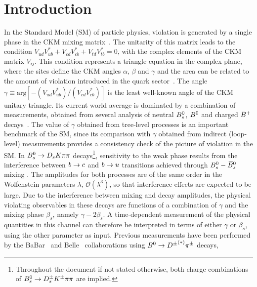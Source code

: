 \section{Introduction}
\label{sec:Introduction}

In the Standard Model (SM) of particle physics, \CP violation is generated by a single phase in the CKM mixing matrix~\cite{Cabibbo:1963yz,doi:10.1143/PTP.49.652}.
The unitarity of this matrix leads to the condition $V_{ud}V^{*}_{ub} + V_{cd}V^{*}_{cb} + V_{td}V^{*}_{tb} = 0$, with the complex elements of the CKM matrix $V_{ij}$. 
This condition represents a triangle equation in the complex plane, where the sites define the CKM angles $\alpha$, $\beta$ and $\gamma$ 
and the area can be related to the amount of \CP violation introduced in the quark sector~\cite{Jarlskog:1985ht}.
The angle $\gamma \equiv \text{arg}[-(V_{ud}V_{ub}^{*})/(V_{cd}V_{cb}^{*})]$ is the least well-known angle of the CKM unitary triangle.
Its current world average is dominated by a combination of \lhcb measurements, obtained from several analysis of neutral ${{B}^0_{s}}$, ${{B}^0}$ and charged ${{{B}^+}}$ decays~\cite{LHCb-CONF-2018-002}.
The value of $\gamma$ obtained from tree-level processes is an important benchmark of the SM, 
since its comparison with $\gamma$ obtained from indirect (loop-level) measurements provides a consistency check of the picture of \CP violation in the SM.\newline
In ${{B}^0_{s}}\rightarrow{\ensuremath{{D}_{s}}}{\ensuremath{K}}{\ensuremath{\pi}}{\ensuremath{\pi}}$ decays\footnote{Throughout the document if not stated otherwise, both charge combinations of ${{B}^0_{s}}\rightarrow{\ensuremath{{D}^{\pm}_{s}}}{\ensuremath{{K}^\pm}}{\ensuremath{\pi}}{\ensuremath{\pi}}$ are implied.}, sensitivity to the weak phase results from the
interference between ${b}\rightarrow{\ensuremath{c}}$ and ${b}\rightarrow{\ensuremath{u}}$  transitions achieved through ${{B}^0_{s}}-{{\kern 0.18em\overline{\kern -0.18em B}{}}{}^0_{s}}$ mixing \cite{Fleischer:2003yb,DeBruyn:2012jp}.
The amplitudes for both processes are of the same order in the Wolfenstein parameters $\lambda$, $\mathcal O(\lambda^3)$, so that interference effects are expected to be large.
Due to the interference between mixing and decay amplitudes, the physical \CP violating observables in these decays are functions of a combination of $\gamma$ and the mixing phase $\beta_s$, namely $\gamma - 2\beta_s$.
A time-dependent measurement of the physical quantities in this channel can therefore be interpreted in terms of either $\gamma$ or $\beta_{s}$, using the other parameter as input.
Previous measurements have been performed by the BaBar~\cite{c8cd5292565f4e2484952d2fc69f4e07,Aubert:2006tw} and Belle~\cite{Ronga:2006hv,Bahinipati:2011yq} collaborations using ${{B}^0}\rightarrow{\ensuremath{{D}^\pm}}^{(*)}\pi^{\pm}$ decays, 
